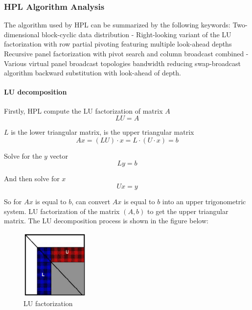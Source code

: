 \documentclass[a4paper,12pt]{article}
\begin{document}
\subsubsection{HPL Algorithm Analysis}

The algorithm used by HPL can be summarized by the following keywords: Two-dimensional block-cyclic data distribution - Right-looking variant of the LU factorization with row partial pivoting featuring multiple look-ahead depths Recursive panel factorization with pivot search and column broadcast combined - Various virtual panel broadcast topologies bandwidth reducing swap-broadcast algorithm backward substitution with look-ahead of depth.

\paragraph{LU decomposition}

Firstly, HPL compute the LU factorization of matrix \( A \)
\begin{equation}
LU=A
\end{equation}

\( L \) is the lower triangular matrix, is the upper triangular matrix
\begin{equation}
Ax=(LU) \cdot x=L \cdot (U \cdot x)=b
\end{equation}

Solve for the \( y \) vector
\begin{equation}
Ly=b
\end{equation}

And then solve for \( x \)
\begin{equation}
U x=y
\end{equation}

So for \( Ax \) is equal to \( b \), can convert \( Ax \) is equal to \( b \) into an upper trigonometric system. LU factorization of the matrix \( (A,b) \) to get the upper triangular matrix. The LU decomposition process is shown in the figure below:

\begin{figure}[H]
    \centering
    \includegraphics[width=0.3\textwidth]{LU_factorization.png}
    \caption{LU factorization}
    \label{fig:lu_factorization}
\end{figure}
\end{document}
